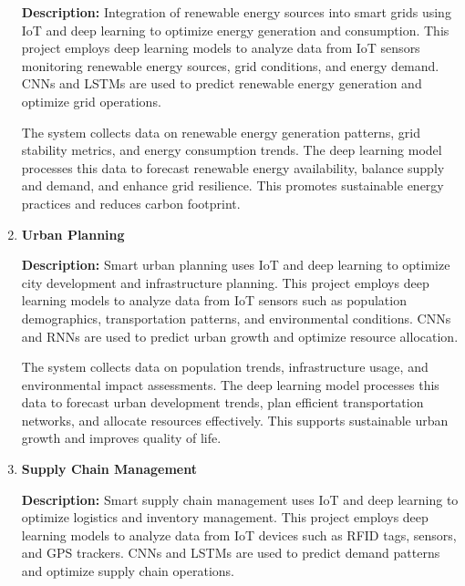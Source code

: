 \documentclass{article}
\begin{document}
\begin{enumerate}[label=\textbf{\arabic*.}, leftmargin=*]
\textbf{Description:}
Integration of renewable energy sources into smart grids using IoT and deep learning to optimize energy generation and consumption. This project employs deep learning models to analyze data from IoT sensors monitoring renewable energy sources, grid conditions, and energy demand. CNNs and LSTMs are used to predict renewable energy generation and optimize grid operations.

The system collects data on renewable energy generation patterns, grid stability metrics, and energy consumption trends. The deep learning model processes this data to forecast renewable energy availability, balance supply and demand, and enhance grid resilience. This promotes sustainable energy practices and reduces carbon footprint.



\vspace{24pt} %
\item \textbf{Urban Planning}

\textbf{Description:}
Smart urban planning uses IoT and deep learning to optimize city development and infrastructure planning. This project employs deep learning models to analyze data from IoT sensors such as population demographics, transportation patterns, and environmental conditions. CNNs and RNNs are used to predict urban growth and optimize resource allocation.

The system collects data on population trends, infrastructure usage, and environmental impact assessments. The deep learning model processes this data to forecast urban development trends, plan efficient transportation networks, and allocate resources effectively. This supports sustainable urban growth and improves quality of life.



\vspace{24pt} %
\item \textbf{Supply Chain Management}

\textbf{Description:}
Smart supply chain management uses IoT and deep learning to optimize logistics and inventory management. This project employs deep learning models to analyze data from IoT devices such as RFID tags, sensors, and GPS trackers. CNNs and LSTMs are used to predict demand patterns and optimize supply chain operations.


\end{enumerate}
\end{document}
